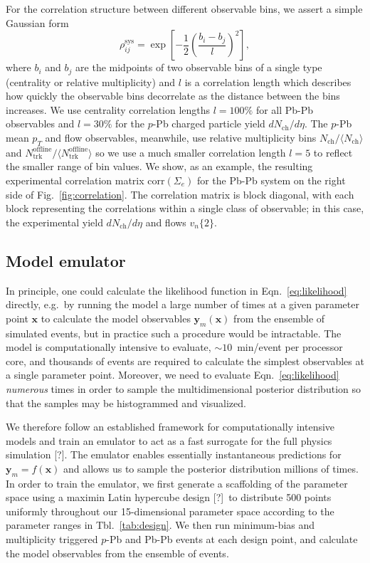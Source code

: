 \documentclass[aps,prc,reprint,amsmath,nofootinbib]{revtex4-1}
\newcommand{\nch}{N_\text{ch}}
\newcommand{\ntrk}{N_\text{trk}^\text{offline}}
\newcommand{\x}{\mathbf{x}}
\newcommand{\y}{\mathbf{y}}
\newcommand{\vnk}[2]{v_#1\{#2\}}
\newcommand{\note}{\textcolor{theblue}{[?]}}
\begin{document}
For the correlation structure between different observable bins, we assert a simple Gaussian form
\begin{equation}
  \label{eq:corr}
  \rho_{ij}^\text{sys} = \exp \left[ -\frac{1}{2} \left(\frac{b_i - b_j}{l} \right)^2 \right],
\end{equation}
where $b_i$ and $b_j$ are the midpoints of two observable bins of a single type (centrality or relative multiplicity) and $l$ is a correlation length which describes how quickly the observable bins decorrelate as the distance between the bins increases.
We use centrality correlation lengths ${l=100\%}$ for all Pb-Pb observables and ${l=30\%}$ for the $p$-Pb charged particle yield $d\nch/d\eta$.
The $p$-Pb mean $p_T$ and flow observables, meanwhile, use relative multiplicity bins $\nch / \langle \nch \rangle$ and $\ntrk / \langle \ntrk \rangle$ so we use a much smaller correlation length $l=5$ to reflect the smaller range of bin values.
We show, as an example, the resulting experimental correlation matrix $\text{corr}(\Sigma_e)$ for the Pb-Pb system on the right side of Fig.~\ref{fig:correlation}.
The correlation matrix is block diagonal, with each block representing the correlations within a single class of observable; in this case, the experimental yield $d\nch/d\eta$ and flows $\vnk{n}{2}$.

\subsection{Model emulator}

In principle, one could calculate the likelihood function in Eqn.~\eqref{eq:likelihood} directly, e.g.\ by running the model a large number of times at a given parameter point $\x$ to calculate the model observables $\y_m(\x)$ from the ensemble of simulated events, but in practice such a procedure would be intractable.
The model is computationally intensive to evaluate, ${\sim}10$~min/event per processor core, and thousands of events are required to calculate the simplest observables at a single parameter point.
Moreover, we need to evaluate Eqn.~\eqref{eq:likelihood} \emph{numerous} times in order to sample the multidimensional posterior distribution so that the samples may be histogrammed and visualized.

We therefore follow an established framework for computationally intensive models and train an emulator to act as a fast surrogate for the full physics simulation \note.
The emulator enables essentially instantaneous predictions for $\y_m = f(\x)$ and allows us to sample the posterior distribution millions of times.
In order to train the emulator, we first generate a scaffolding of the parameter space using a maximin Latin hypercube design \note\ to distribute 500 points uniformly throughout our 15-dimensional parameter space according to the parameter ranges in Tbl.~\ref{tab:design}.
We then run minimum-bias and multiplicity triggered $p$-Pb and Pb-Pb events at each design point, and calculate the model observables from the ensemble of events.
\end{document}
